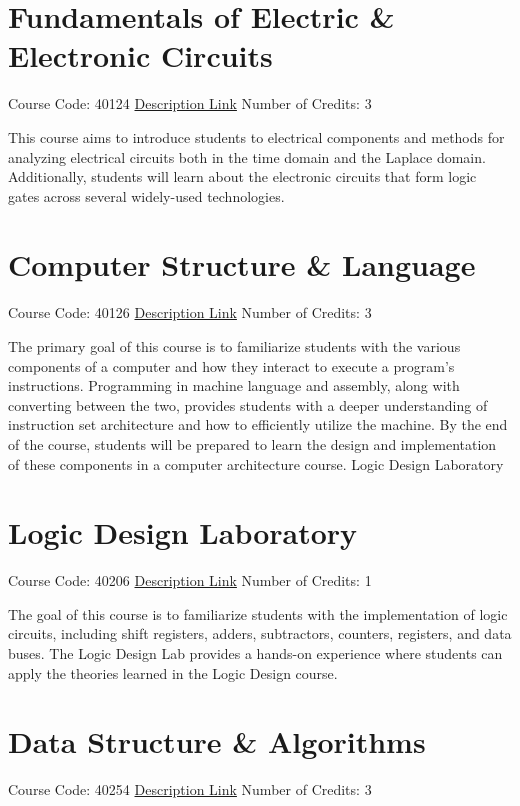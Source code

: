 \documentclass[
fontsize=11pt,
paper=a4,
parskip=half,
enlargefirstpage=off,    %
fromalign=right,        %
fromphone=on,           %
fromemail=on,
fromrule=off,           %
addrfield=off,          %
backaddress=on,         %
subject=beforeopening,  %
locfield=narrow,        %
foldmarks=off,          %
open=any
]{scrartcl}
\begin{document}
\section{Fundamentals of Electric \& Electronic Circuits}
Course Code: 40124 \qquad \quad \href{https://docs.ce.sharif.edu/course/40124}{Description Link}
\qquad \quad Number of Credits: 3

This course aims to introduce students to electrical components and methods for analyzing electrical circuits both in the time domain and the Laplace domain. Additionally, students will learn about the electronic circuits that form logic gates across several widely-used technologies.

\section{Computer Structure \& Language}
Course Code: 40126 \qquad \quad \href{https://docs.ce.sharif.edu/course/40126}{Description Link}
\qquad \quad Number of Credits: 3

The primary goal of this course is to familiarize students with the various components of a computer and how they interact to execute a program’s instructions. Programming in machine language and assembly, along with converting between the two, provides students with a deeper understanding of instruction set architecture and how to efficiently utilize the machine. By the end of the course, students will be prepared to learn the design and implementation of these components in a computer architecture course.
Logic Design Laboratory


\section{Logic Design Laboratory}
Course Code: 40206 \qquad \quad \href{https://docs.ce.sharif.edu/course/40206}{Description Link}
\qquad \quad Number of Credits: 1

The goal of this course is to familiarize students with the implementation of logic circuits, including shift registers, adders, subtractors, counters, registers, and data buses. The Logic Design Lab provides a hands-on experience where students can apply the theories learned in the Logic Design course.

\section{Data Structure \& Algorithms}
Course Code: 40254 \qquad \quad \href{https://docs.ce.sharif.edu/course/40254}{Description Link}
\qquad \quad Number of Credits: 3
\end{document}
